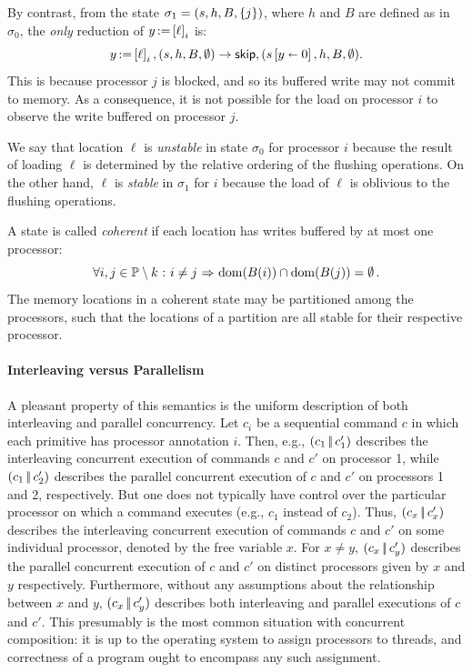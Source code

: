 \documentclass[11pt]{report}
\begin{document}
By contrast, from the state $\sigma_1 = (s,h,B,\left\lbrace j \right\rbrace)$, where $h$ and $B$ are defined as in $\sigma_0$, the \emph{only} reduction of $y \operatorname{:\!=} \left[ \ell \right]_i$ is: \[ y \operatorname{:\!=} \left[ \ell \right]_i,(s,h,B,\operatorname{\emptyset}) \rightarrow \operatorname{\mathsf{skip}},(s \left[ y \shortleftarrow 0 \right],h,B,\operatorname{\emptyset}).\] This is because processor $j$ is blocked, and so its buffered write may not commit to memory. As a consequence, it is not possible for the load on processor $i$ to observe the write buffered on processor $j$. 

We say that location $\ell$ is \emph{unstable} in state $\sigma_0$ for processor $i$ because the result of loading $\ell$ is determined by the relative ordering of the flushing operations. On the other hand, $\ell$ is \emph{stable} in $\sigma_1$ for $i$ because the load of $\ell$ is oblivious to the flushing operations. 

A state is called \emph{coherent} if each location has writes buffered by at most one processor: \[ \forall i,j \in \mathbb{P} \setminus k \operatorname{\,:\,} i \neq j \operatorname{\,\Rightarrow\,} \operatorname{\mathrm{dom}}(B(i)) \cap \operatorname{\mathrm{dom}}(B(j)) = \operatorname{\emptyset}.\] The memory locations in a coherent state may be partitioned among the processors, such that the locations of a partition are all stable for their respective processor.

\paragraph{Interleaving versus Parallelism} A pleasant property of this semantics is the uniform description of both interleaving and parallel concurrency. Let $c_i$ be a sequential command $c$ in which each primitive has processor annotation $i$. Then, e.g., $(c_1 \operatorname{|\!|} c'_1)$ describes the interleaving concurrent execution of commands $c$ and $c'$ on processor 1, while $(c_1 \operatorname{|\!|} c'_2)$ describes the parallel concurrent execution of $c$ and $c'$ on processors 1 and 2, respectively. But one does not typically have control over the particular processor on which a command executes (e.g., $c_1$ instead of $c_2$). Thus, $(c_x \operatorname{|\!|} c'_x)$ describes the interleaving concurrent execution of commands $c$ and $c'$ on some individual processor, denoted by the free variable $x$. For $x \neq y$, $(c_x \operatorname{|\!|} c'_y)$ describes the parallel concurrent execution of $c$ and $c'$ on distinct processors given by $x$ and $y$ respectively. Furthermore, without any assumptions about the relationship between $x$ and $y$, $(c_x \operatorname{|\!|} c'_y)$ describes both interleaving and parallel executions of $c$ and $c'$. This presumably is the most common situation with concurrent composition: it is up to the operating system to assign processors to threads, and correctness of a program ought to encompass any such assignment. 
\end{document}
